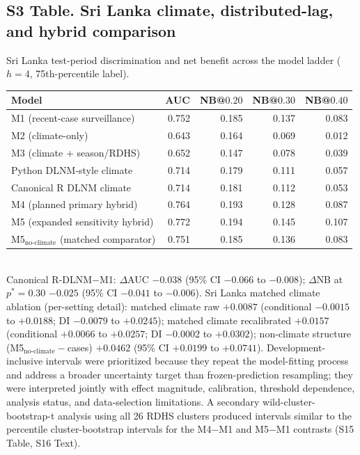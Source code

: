 \documentclass[11pt,a4paper]{article}
\begin{document}
\subsection*{S3 Table. Sri Lanka climate, distributed-lag, and hybrid comparison}
\noindent Sri Lanka test-period discrimination and net benefit across the model ladder ($h=4$, 75th-percentile label).\\[0.3em]
{\footnotesize\begin{tabular}{@{}lrrrr@{}}
\toprule
Model & AUC & NB@$0.20$ & NB@$0.30$ & NB@$0.40$ \\
\midrule
M1 (recent-case surveillance) & 0.752 & 0.185 & 0.137 & 0.083 \\
M2 (climate-only) & 0.643 & 0.164 & 0.069 & 0.012 \\
M3 (climate $+$ season/RDHS) & 0.652 & 0.147 & 0.078 & 0.039 \\
Python DLNM-style climate & 0.714 & 0.179 & 0.111 & 0.057 \\
Canonical R DLNM climate & 0.714 & 0.181 & 0.112 & 0.053 \\
M4 (planned primary hybrid) & 0.764 & 0.193 & 0.128 & 0.087 \\
M5 (expanded sensitivity hybrid) & 0.772 & 0.194 & 0.145 & 0.107 \\
M5$_{\text{no-climate}}$ (matched comparator) & 0.751 & 0.185 & 0.136 & 0.083 \\
\bottomrule
\end{tabular}}\\[0.3em]
Canonical R-DLNM$-$M1: $\Delta$AUC $-0.038$ (95\% CI $-0.066$ to $-0.008$); $\Delta$NB at $p^*=0.30$ $-0.025$ (95\% CI $-0.041$ to $-0.006$). Sri Lanka matched climate ablation (per-setting detail): matched climate raw $+0.0087$ (conditional $-0.0015$ to $+0.0188$; DI $-0.0079$ to $+0.0245$); matched climate recalibrated $+0.0157$ (conditional $+0.0066$ to $+0.0257$; DI $-0.0002$ to $+0.0302$); non-climate structure (M5$_{\text{no-climate}}-$cases) $+0.0462$ (95\% CI $+0.0199$ to $+0.0741$). Development-inclusive intervals were prioritized because they repeat the model-fitting process and address a broader uncertainty target than frozen-prediction resampling; they were interpreted jointly with effect magnitude, calibration, threshold dependence, analysis status, and data-selection limitations. A secondary wild-cluster-bootstrap-t analysis using all 26 RDHS clusters produced intervals similar to the percentile cluster-bootstrap intervals for the M4$-$M1 and M5$-$M1 contrasts (S15 Table, S16 Text).
\end{document}
